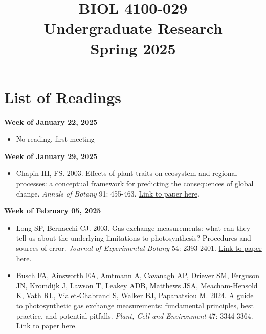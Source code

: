 \documentclass[12pt, notitlepage]{article}   	%
\title{
	\textbf{
		BIOL 4100-029
	} \\
	\large Undergraduate Research \\
	\large Spring 2025
}
\date{\vspace{-5ex}}
\begin{document}
{\selectfont %

\maketitle

\section{List of Readings}

\textbf{Week of January 22, 2025}
\begin{itemize}
    \item No reading, first meeting
\end{itemize}

\textbf{Week of January 29, 2025}

\begin{itemize}
    \item Chapin III, FS. 2003. Effects of plant traits on ecosystem and regional processes: a conceptual framework for predicting the consequences of global change. \textit{Annals of Botany} 91: 455-463. \href{https://academic.oup.com/aob/article-abstract/91/4/455/213070?redirectedFrom=fulltext}{Link to paper here}.
\end{itemize}

\textbf{Week of February 05, 2025}

\begin{itemize}
    \item Long SP, Bernacchi CJ. 2003. Gas exchange measurements: what can they tell us about the underlying limitations to photosynthesis? Procedures and sources of error. \textit{Journal of Experimental Botany} 54: 2393-2401. \href{https://academic.oup.com/jxb/article/54/392/2393/621914}{Link to paper here}.
    \item Busch FA, Ainsworth EA, Amtmann A, Cavanagh AP, Driever SM, Ferguson JN, Kromdijk J, Lawson T, Leakey ADB, Matthews JSA, Meacham-Hensold K, Vath RL, Vialet-Chabrand S, Walker BJ, Papanatsiou M. 2024. A guide to photosynthetic gas exchange measurements: fundamental principles, best practice, and potential pitfalls. \textit{Plant, Cell and Environment} 47: 3344-3364. \href{https://onlinelibrary.wiley.com/doi/full/10.1111/pce.14815}{Link to paper here}.
\end{itemize}

}
\end{document}
